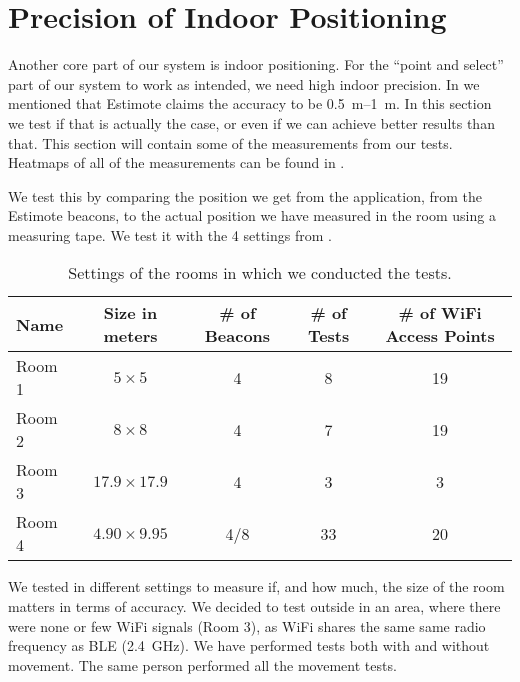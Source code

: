 \section{Precision of Indoor Positioning}\label{sec:estimoteprecision}
Another core part of our system is indoor positioning. 
For the ``point and select'' part of our system to work as intended, 
we need high indoor precision. 
In  we mentioned that Estimote claims the accuracy to be \SIrange{0.5}{1}{\meter}.
In this section we test if that is actually the case, 
or even if we can achieve better results than that. 
This section will contain some of the measurements from our tests. 
Heatmaps of all of the measurements can be found in .

We test this by comparing the position we get from the application, \ie from the Estimote beacons,
to the actual position we have measured in the room using a measuring tape.
We test it with the \num{4} settings from .

\begin{table}
  \centering
  \begin{tabular}{l| c c c c}
  	Name   & Size in meters     & \# of Beacons   & \# of Tests & \# of WiFi Access Points \\ \hline
  	Room 1 & $5 \times 5$       & \num{4}         & \num{8}     & \num{19}                 \\
  	Room 2 & $8 \times 8$       & \num{4}         & \num{7}     & \num{19}                 \\
  	Room 3 & $17.9 \times 17.9$ & \num{4}         & \num{3}     & \num{3}                  \\
  	Room 4 & $4.90 \times 9.95$  & \num{4}/\num{8} & \num{33}    & \num{20}
  \end{tabular}
  \caption{Settings of the rooms in which we conducted the tests.}
  \label{table:rooms}
\end{table}

We tested in different settings to measure if, and how much, 
the size of the room matters in terms of accuracy. 
We decided to test outside in an area, 
where there were none or few WiFi signals (Room 3),
as WiFi shares the same same radio frequency as BLE (\SI{2.4}{\GHz}). 
We have performed tests both with and without movement. 
The same person performed all the movement tests. 

